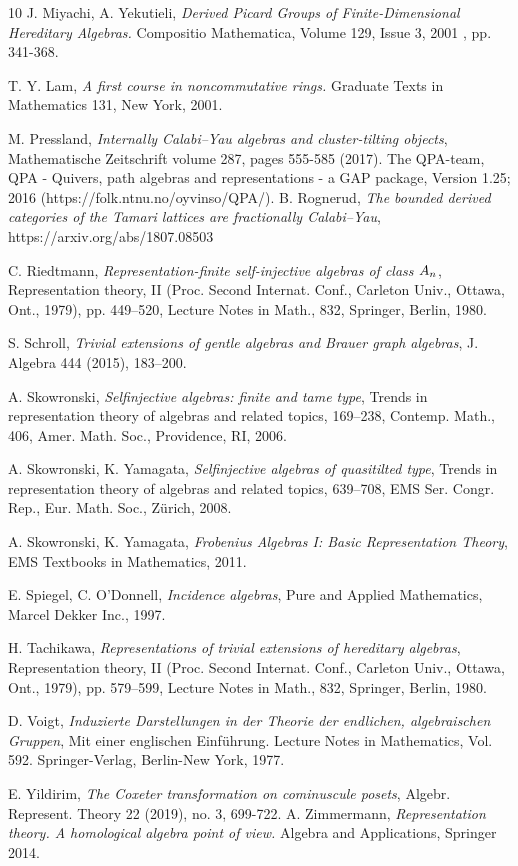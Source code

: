 \documentclass[a4paper,reqno,11pt]{amsart}
\theoremstyle{definition}
\numberwithin{equation}{section}
\begin{document}
\begin{thebibliography}{10}
 J. Miyachi, A. Yekutieli, {\it Derived Picard Groups of Finite-Dimensional Hereditary Algebras.} Compositio Mathematica, Volume 129, Issue 3, 2001 , pp. 341-368. 

 T. Y. Lam, {\it A first course in noncommutative rings.} Graduate Texts in Mathematics 131, New York, 2001.

 M. Pressland, {\it Internally Calabi–Yau algebras and cluster-tilting objects}, Mathematische Zeitschrift volume 287, pages 555-585 (2017).
 The QPA-team, QPA - Quivers, path algebras and representations - a GAP package, Version 1.25; 2016 (https://folk.ntnu.no/oyvinso/QPA/).
 B. Rognerud, {\it The bounded derived categories of the Tamari lattices are fractionally Calabi--Yau}, https://arxiv.org/abs/1807.08503 

 C. Riedtmann, \emph{Representation-finite self-injective algebras of class $A\sb{n}$}, Representation theory, II (Proc. Second Internat. Conf., Carleton Univ., Ottawa, Ont., 1979), pp. 449--520, Lecture Notes in Math., 832, Springer, Berlin, 1980.

 S. Schroll, \emph{Trivial extensions of gentle algebras and Brauer graph algebras}, J. Algebra 444 (2015), 183--200.

 A. Skowronski, \emph{Selfinjective algebras: finite and tame type}, Trends in representation theory of algebras and related topics, 169--238, Contemp. Math., 406, Amer. Math. Soc., Providence, RI, 2006.

 A. Skowronski, K. Yamagata, \emph{Selfinjective algebras of quasitilted type}, Trends in representation theory of algebras and related topics, 639--708, EMS Ser. Congr. Rep., Eur. Math. Soc., Zürich, 2008.

 A. Skowronski, K. Yamagata, {\it Frobenius Algebras I: Basic Representation Theory}, EMS Textbooks in Mathematics, 2011.

 E. Spiegel, C. O'Donnell, {\it Incidence algebras}, Pure and Applied Mathematics, Marcel Dekker Inc., 1997.

 H. Tachikawa, \emph{Representations of trivial extensions of hereditary algebras}, Representation theory, II (Proc. Second Internat. Conf., Carleton Univ., Ottawa, Ont., 1979), pp. 579--599, Lecture Notes in Math., 832, Springer, Berlin, 1980.

 D. Voigt, \emph{Induzierte Darstellungen in der Theorie der endlichen, algebraischen Gruppen}, Mit einer englischen Einführung. Lecture Notes in Mathematics, Vol. 592. Springer-Verlag, Berlin-New York, 1977.

 E. Yildirim, {\it The Coxeter transformation on cominuscule posets}, Algebr. Represent. Theory 22 (2019), no. 3, 699-722. 
 A. Zimmermann, \emph{Representation theory. A homological algebra point of view.} Algebra and Applications, Springer 2014.
\end{thebibliography}
\end{document}
